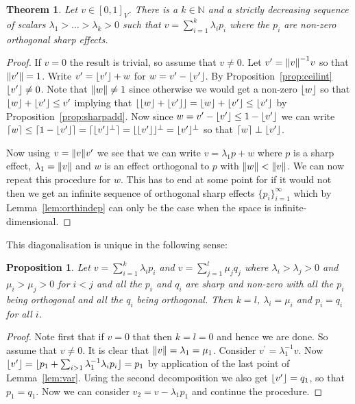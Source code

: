 \documentclass[a4paper,onecolumn,10pt,accepted=2019-05-03, issue=1, volume=1, shorttitle=papers/compositionality-1-1]{compositionalityarticle}
\DeclarePairedDelimiter{\ceil}{\lceil}{\rceil}
\DeclarePairedDelimiter{\floor}{\lfloor}{\rfloor}
\newcounter{counter}
\numberwithin{counter}{section}
\newtheorem{theorem}[counter]{Theorem}
\newtheorem{proposition}[counter]{Proposition}
\newcommand{\N}{\mathbb{N}}
\begin{document}
\begin{theorem}\label{theor:diag}
	Let $v\in[0,1]_V$. There is a $k\in \N$ and a strictly decreasing sequence of scalars $\lambda_1>\ldots>\lambda_k>0$ such that $v=\sum_{i=1}^k \lambda_i p_i$ where the $p_i$ are non-zero orthogonal sharp effects.
\end{theorem}
\begin{proof}
If $v=0$ the result is trivial, so assume that $v\neq 0$. 
Let $v^\prime = \norm{v}^{-1} v$ so that $\norm{v^\prime} = 1$. Write $v^\prime = \floor{v^\prime} + w$ for $w=v^\prime - \floor{v^\prime}$. By Proposition~\ref{prop:ceilint} $\floor{v^\prime} \neq 0$. 
Note that $\norm{w}\neq 1$ since otherwise we would get a non-zero $\floor{w}$ so that $\floor{w}+\floor{v^\prime}\leq v^\prime$ implying that $\floor{\floor{w}+\floor{v^\prime}} = \floor{w}+\floor{v^\prime}\leq \floor{v^\prime}$ by Proposition~\ref{prop:sharpadd}. 
Now since $w=v^\prime-\floor{v^\prime}\leq 1 - \floor{v^\prime}$ we can write $\ceil{w}\leq \ceil{1-\floor{v^\prime}} = \ceil{\floor{v^\prime}^\perp} = \floor{\floor{v^\prime}}^\perp = \floor{v^\prime}^\perp$ so that $\ceil{w} \perp \floor{v^\prime}$.

Now using $v = \norm{v}v^\prime$ we see that we can write $v = \lambda_1 p + w$ where $p$ is a sharp effect, $\lambda_1 = \norm{v}$ and $w$ is an effect orthogonal to $p$ with $\norm{w}<\norm{v}$. We can now repeat this procedure for $w$. This has to end at some point for if it would not then we get an infinite sequence of orthogonal sharp effects $\{p_i\}_{i=1}^\infty$ which by Lemma~\ref{lem:orthindep} can only be the case when the space is infinite-dimensional.
\end{proof}

\noindent This diagonalisation is unique in the following sense:

\begin{proposition}
	Let $v = \sum_{i=1}^k \lambda_i p_i$ and $v=\sum_{j=1}^l \mu_j q_j$ where $\lambda_i>\lambda_j>0$ and $\mu_i>\mu_j>0$ for $i<j$ and all the $p_i$ and $q_i$ are sharp and non-zero with all the $p_i$ being orthogonal and all the $q_i$ being orthogonal. Then $k=l$, $\lambda_i=\mu_i$ and $p_i=q_i$ for all $i$.
\end{proposition}
\begin{proof}
	Note first that if $v=0$ that then $k=l=0$ and hence we are done. So assume that $v\neq 0$. It is clear that $\norm{v}=\lambda_1=\mu_1$. Consider $v^\prime = \lambda_1^{-1}v$. Now $\floor{v^\prime}=\floor{p_1 + \sum_{i>1}\lambda_1^{-1}\lambda_i p_i} = p_1$ by application of the last point of Lemma~\ref{lem:var}. Using the second decomposition we also get $\floor{v^\prime} = q_1$, so that $p_1=q_1$. Now we can consider $v_2 = v-\lambda_1p_1$ and continue the procedure.
\end{proof}
\end{document}
